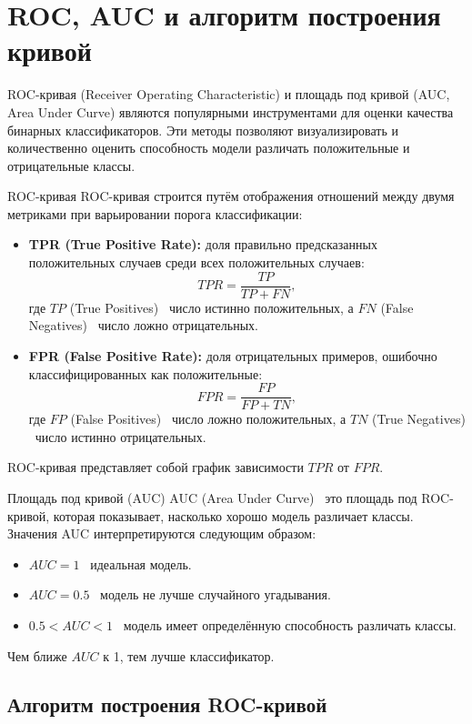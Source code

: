 \section*{ROC, AUC и алгоритм построения кривой}

ROC-кривая (Receiver Operating Characteristic) и площадь под кривой (AUC, Area Under Curve) являются популярными инструментами для оценки качества бинарных классификаторов. Эти методы позволяют визуализировать и количественно оценить способность модели различать положительные и отрицательные классы.

ROC-кривая
ROC-кривая строится путём отображения отношений между двумя метриками при варьировании порога классификации:
\begin{itemize}
    \item \textbf{TPR (True Positive Rate):} доля правильно предсказанных положительных случаев среди всех положительных случаев:
          \[
              TPR = \frac{TP}{TP + FN},
          \]
          где $TP$ (True Positives) \textendash\ число истинно положительных, а $FN$ (False Negatives) \textendash\ число ложно отрицательных.
    \item \textbf{FPR (False Positive Rate):} доля отрицательных примеров, ошибочно классифицированных как положительные:
          \[
              FPR = \frac{FP}{FP + TN},
          \]
          где $FP$ (False Positives) \textendash\ число ложно положительных, а $TN$ (True Negatives) \textendash\ число истинно отрицательных.
\end{itemize}
ROC-кривая представляет собой график зависимости $TPR$ от $FPR$.

Площадь под кривой (AUC)
AUC (Area Under Curve) \textendash\ это площадь под ROC-кривой, которая показывает, насколько хорошо модель различает классы. Значения AUC интерпретируются следующим образом:
\begin{itemize}
    \item $AUC = 1$ \textendash\ идеальная модель.
    \item $AUC = 0.5$ \textendash\ модель не лучше случайного угадывания.
    \item $0.5 < AUC < 1$ \textendash\ модель имеет определённую способность различать классы.
\end{itemize}
Чем ближе $AUC$ к 1, тем лучше классификатор.

\subsection*{Алгоритм построения ROC-кривой}

